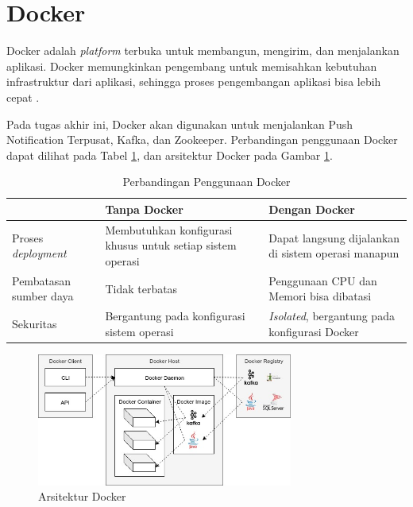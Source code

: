 \section{Docker}
\par Docker adalah \textit{platform} terbuka untuk membangun, mengirim, dan menjalankan aplikasi. Docker memungkinkan pengembang untuk memisahkan kebutuhan infrastruktur dari aplikasi, sehingga proses pengembangan aplikasi bisa lebih cepat \cite{docker-online}.
\par Pada tugas akhir ini, Docker akan digunakan untuk menjalankan Push Notification Terpusat, Kafka, dan Zookeeper. Perbandingan penggunaan Docker dapat dilihat pada Tabel \ref{t:perbandingan_docker}, dan arsitektur Docker pada Gambar \ref{img:arsitektur-docker}.
\begin{longtable}{|p{2.5cm}|p{3.5cm}|p{3.5cm}|}
	\caption{Perbandingan Penggunaan Docker} \label{t:perbandingan_docker} \\ \hline
	\rowcolor{lightgray} & Tanpa Docker & Dengan Docker \\ \hline
	Proses \textit{deployment} & Membutuhkan konfigurasi khusus untuk setiap sistem operasi & Dapat langsung dijalankan di sistem operasi manapun \\ \hline
	Pembatasan sumber daya & Tidak terbatas & Penggunaan CPU dan Memori bisa dibatasi \\ \hline
	Sekuritas & Bergantung pada konfigurasi sistem operasi & \textit{Isolated}, bergantung pada konfigurasi Docker \\ \hline
\end{longtable}
\begin{figure}[H]
\centering\includegraphics[width=0.75\textwidth]{bab2/img/arsitektur-docker.jpg}
\caption{Arsitektur Docker}
\label{img:arsitektur-docker}
\end{figure}

